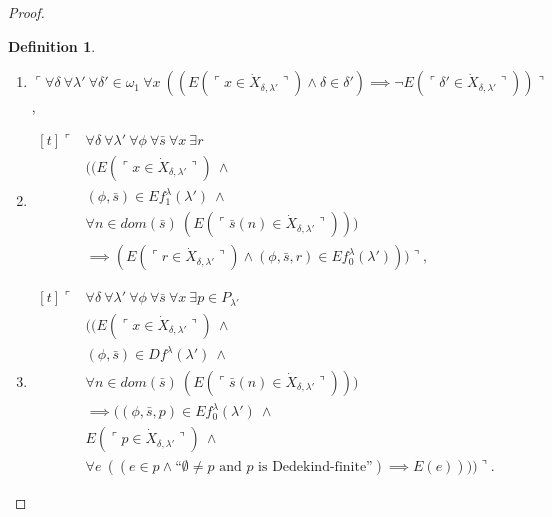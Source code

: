 \documentclass[12pt, twoside]{memoir}
\numberwithin{equation}{section}
\theoremstyle{definition}
\newtheorem{defi}[thm]{Definition}
\theoremstyle{remark}
\theoremstyle{definition}
\theoremstyle{definition}
\theoremstyle{definition}
\theoremstyle{remark}
\begin{document}
\begin{proof}
\begin{defi}
\begin{enumerate}[label=(S\arabic*)$_{\lambda}$, leftmargin=40pt]
    \item\label{c6} $\ulcorner \forall \delta \ \forall \lambda' \ \forall \delta' \in \omega_1 \ \forall x \ ((E(\ulcorner x \in \dot{X}_{\delta, \lambda'} \urcorner) \wedge \delta \in \delta') \implies \neg E(\ulcorner \delta' \in \dot{X}_{\delta, \lambda'} \urcorner)) \urcorner$, 
    
    \item\label{c7} 
    \!
    $\begin{aligned}[t]
        \ulcorner & \forall \delta \ \forall \lambda' \ \forall \phi \ \forall \bar{s} \ \forall x \ \exists r \\
        & ((E(\ulcorner x \in \dot{X}_{\delta, \lambda'} \urcorner) \ \wedge \ \\
        & (\phi, \bar{s}) \in Ef_1^{\lambda}(\lambda') \ \wedge \\
        & \forall n \in dom(\bar{s}) \ (E(\ulcorner \bar{s}(n) \in \dot{X}_{\delta, \lambda'} \urcorner))) \\
        & \implies (E(\ulcorner r \in \dot{X}_{\delta, \lambda'} \urcorner) \wedge (\phi, \bar{s}, r) \in Ef_0^{\lambda}(\lambda'))) \urcorner,
    \end{aligned}$
    
    \item\label{c8}
    \!
    $\begin{aligned}[t]
        \ulcorner & \forall \delta \ \forall \lambda' \ \forall \phi \ \forall \bar{s} \ \forall x \ \exists p \in P_{\lambda'} \\
        & ((E(\ulcorner x \in \dot{X}_{\delta, \lambda'} \urcorner) \ \wedge \\
        & (\phi, \bar{s}) \in Df^{\lambda}(\lambda') \ \wedge \\
        & \forall n \in dom(\bar{s}) \ (E(\ulcorner \bar{s}(n) \in \dot{X}_{\delta, \lambda'} \urcorner))) \\
        & \implies ((\phi, \bar{s}, p) \in Ef_0^{\lambda}(\lambda') \ \wedge \\
        & E(\ulcorner p \in \dot{X}_{\delta, \lambda'} \urcorner) \ \wedge \\
        & \forall e \ ((e \in p \wedge \text{``}\emptyset \neq p \text{ and } p \text{ is Dedekind-finite''}) \implies E(e)))) \urcorner.
    \end{aligned}$
\end{enumerate}
\end{defi}


\end{proof}
\end{document}
